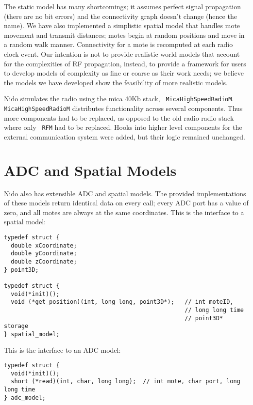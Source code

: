 \documentclass[10pt]{article}
\begin{document}
The static model has many shortcomings; it assumes perfect signal
propagation (there are no bit errors) and the connectivity graph
doesn't change (hence the name). We have also implemented a simplistic
spatial model that handles mote movement and transmit distances; motes
begin at random positions and move in a random walk
manner. Connectivity for a mote is recomputed at each radio clock
event. Our intention is not to provide realistic world models that
account for the complexities of RF propagation, instead, to provide a
framework for users to develop models of complexity as fine or coarse
as their work needs; we believe the models we have developed show the
feasibility of more realistic models.

Nido simulates the radio using the mica 40Kb stack, {\tt
MicaHighSpeedRadioM}. {\tt MicaHighSpeedRadioM} distributes
functionality across several components. Thus more components had to
be replaced, as opposed to the old radio radio stack where only {\tt
RFM} had to be replaced. Hooks into higher level components for the
external communication system were added, but their logic remained
unchanged.

\section*{ADC and Spatial Models}

Nido also has extensible ADC and spatial models. The provided
implementations of these models return identical data on every call;
every ADC port has a value of zero, and all motes are always at the
same coordinates. This is the interface to a spatial model:

\begin{verbatim}
typedef struct {
  double xCoordinate;
  double yCoordinate;
  double zCoordinate;
} point3D;

typedef struct {
  void(*init)();
  void (*get_position)(int, long long, point3D*);   // int moteID,
                                                    // long long time
                                                    // point3D* storage
} spatial_model;
\end{verbatim}

This is the interface to an ADC model:

\begin{verbatim}
typedef struct {
  void(*init)();
  short (*read)(int, char, long long);  // int mote, char port, long long time
} adc_model;
\end{verbatim}
\end{document}
